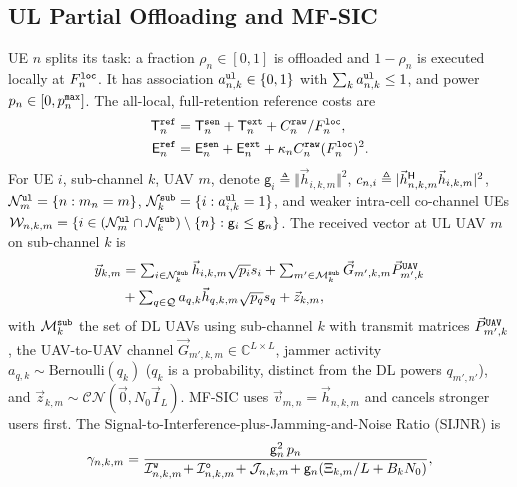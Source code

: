 \documentclass[journal]{IEEEtran}
\begin{document}
\subsection{UL Partial Offloading and MF-SIC}
\label{sec:ul}
UE $n$ splits its task: a fraction $\rho_n\in[0,1]$ is offloaded and $1-\rho_n$ is executed locally at $F_n^{\tt loc}$. It has association $a_{n,k}^{\tt ul}\in\{0,1\}$ with $\sum_k a_{n,k}^{\tt ul}\le 1$, and power $p_n\in[0,p_n^{\tt max}]$. The all-local, full-retention reference costs are
\begin{align}
\mathsf{T}_n^{\tt ref}&=\mathsf{T}_n^{\tt sen}+\mathsf{T}_n^{\tt ext}+C_n^{\tt raw}/F_n^{\tt loc},
\label{eq:ref}\\
\mathsf{E}_n^{\tt ref}&=\mathsf{E}_n^{\tt sen}+\mathsf{E}_n^{\tt ext}+\kappa_n C_n^{\tt raw}(F_n^{\tt loc})^2 .
\nonumber
\end{align}
{\color{blue}For UE $i$, sub-channel $k$, UAV $m$, denote $\mathsf{g}_i\triangleq\Vert\vec{h}_{i,k,m}\Vert^2$, $c_{n,i}\triangleq|\vec{h}_{n,k,m}^{\sf H}\vec{h}_{i,k,m}|^2$, 
$\mathcal{N}_m^{\tt ul}=\{n:m_n=m\}$,
$\mathcal{N}_k^{\tt sub}=\{i:a_{i,k}^{\tt ul}=1\}$, and weaker intra-cell co-channel UEs $\mathcal{W}_{n,k,m}=\{i\in(\mathcal{N}_m^{\tt ul}\cap\mathcal{N}_k^{\tt sub})\setminus\{n\}:\mathsf{g}_i\le\mathsf{g}_n\}$.}
The received vector at UL UAV $m$ on sub-channel $k$ is
\begin{equation}
\begin{aligned}
\textstyle\vec{y}_{k,m}&=\textstyle\sum_{i\in\mathcal{N}_k^{\tt sub}}\vec{h}_{i,k,m}\sqrt{p_i}s_i+\sum_{m'\in\mathcal{M}_k^{\tt sub}}\vec{G}_{m',k,m}\vec{P}_{m',k}^{\tt UAV}\\
&\textstyle+\sum_{q\in\mathcal{Q}}a_{q,k}\vec{h}_{q,k,m}\sqrt{p_q}s_q+\vec{z}_{k,m},
\end{aligned}
\label{eq:ul_y}
\end{equation}
{\color{blue}with $\mathcal{M}_k^{\tt sub}$ the set of DL UAVs using sub-channel $k$ with transmit matrices $\vec{P}_{m',k}^{\tt UAV}$}, the UAV-to-UAV channel $\vec{G}_{m',k,m}\in\mathbb{C}^{L\times L}$, jammer activity $a_{q,k}\sim\mathrm{Bernoulli}(q_k)$ ($q_k$ is a probability, distinct from the DL powers $q_{m',n'}$), and $\vec{z}_{k,m}\sim\mathcal{CN}(\vec{0},N_0\vec{I}_L)$. MF-SIC uses $\vec{v}_{m,n}=\vec{h}_{n,k,m}$ and cancels stronger users first. The Signal-to-Interference-plus-Jamming-and-Noise Ratio (SIJNR) is
\begin{equation}
\gamma_{n,k,m}
=\frac{\mathsf{g}_n^2\, p_n}
{\mathcal{I}_{n,k,m}^{\tt w}\!+\mathcal{I}_{n,k,m}^{\tt o}\!+\mathcal{J}_{n,k,m}
\!+\mathsf{g}_n(\Xi_{k,m}/L+B_kN_0)},
\label{eq:ul_sijnr}
\end{equation}
\end{document}
